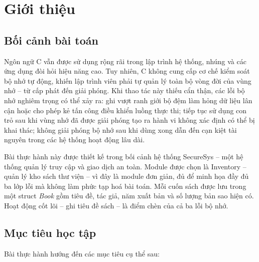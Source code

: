 
\section{Giới thiệu}

\subsection{Bối cảnh bài toán}

Ngôn ngữ C vẫn được sử dụng rộng rãi trong lập trình hệ thống, nhúng và các
ứng dụng đòi hỏi hiệu năng cao. Tuy nhiên, C không cung cấp cơ chế kiểm soát
bộ nhớ tự động, khiến lập trình viên phải tự quản lý toàn bộ vòng đời của vùng
nhớ -- từ cấp phát đến giải phóng. Khi thao tác này thiếu cẩn thận, các lỗi bộ
nhớ nghiêm trọng có thể xảy ra: ghi vượt ranh giới bộ đệm làm hỏng dữ liệu lân
cận hoặc cho phép kẻ tấn công điều khiển luồng thực thi; tiếp tục sử dụng con
trỏ sau khi vùng nhớ đã được giải phóng tạo ra hành vi không xác định có thể bị
khai thác; không giải phóng bộ nhớ sau khi dùng xong dẫn đến cạn kiệt tài
nguyên trong các hệ thống hoạt động lâu dài.

Bài thực hành này được thiết kế trong bối cảnh hệ thống SecureSys --
một hệ thống quản lý truy cập và giao dịch an toàn. Module được chọn là
Inventory -- quản lý kho sách thư viện -- vì đây là module đơn giản,
đủ để minh họa đầy đủ ba lớp lỗi mà không làm phức tạp hoá bài toán. Mỗi cuốn
sách được lưu trong một struct \textit{Book} gồm tiêu đề, tác giả, năm xuất bản
và số lượng bản sao hiện có. Hoạt động cốt lõi -- ghi tiêu đề sách -- là điểm
chèn của cả ba lỗi bộ nhớ.

\subsection{Mục tiêu học tập}

Bài thực hành hướng đến các mục tiêu cụ thể sau:

